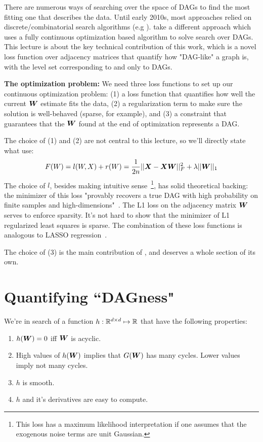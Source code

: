 \documentclass[11pt,a4paper]{article}
\begin{document}
There are numerous ways of searching over the space of DAGs to find the most fitting one that describes the data. Until early 2010s, most approaches relied on discrete/combinatorial search algorithms (e.g \citet{heckerman1994combination}). \citet{zheng2018dags} take a different approach which uses a fully continuous optimization based algorithm to solve search over DAGs. This lecture is about the key technical contribution of this work, which is a novel loss function over adjacency matrices that quantify how "DAG-like" a graph is, with the level set corresponding to and only to DAGs. 

\textbf{The optimization problem: } We need three loss functions to set up our continuous optimization problem: (1) a loss function that quantifies how well the current ${\bm{W}}$ estimate fits the data, (2) a regularization term to make sure the solution is well-behaved (sparse, for example), and (3) a constraint that guarantees that the ${\bm{W}}$ found at the end of optimization represents a DAG. 

The choice of (1) and (2) are not central to this lecture, so we'll directly state what \citet{zheng2018dags} use:
\begin{align}
    F(W) = l(W, X) + r(W) = \frac{1}{2n} ||{\bm{X}} - {\bm{X}} {\bm{W}}||_{F}^{2} + \lambda ||{\bm{W}}||_1
\end{align}
The choice of $l$, besides making intuitive sense~\footnote{This loss has a maximum likelihood interpretation if one assumes that the exogenous noise terms are unit Gaussian.}, has solid theoretical backing: the minimizer of this loss "provably recovers a true DAG with high probability on finite samples and high-dimensions"~\citep{zheng2018dags}. The L1 loss on the adjacency matrix ${\bm{W}}$ serves to enforce sparsity. It's not hard to show that the minimizer of L1 regularized least squares is sparse. The combination of these loss functions is analogous to LASSO regression~\citep{tibshirani1996regression}. 

The choice of (3) is the main contribution of \citep{zheng2018dags}, and deserves a whole section of its own. 

\section{Quantifying ``DAGness"}
We're in search of a function $h: \mathbb{R}^{d \times d} \mapsto \mathbb{R}$ that have the following properties:
\begin{enumerate}
    \item $h({\bm{W}}) = 0$ iff ${\bm{W}}$ is acyclic. 
    \item High values of $h({\bm{W}})$ implies that $G({\bm{W}})$ has many cycles. Lower values imply not many cycles. 
    \item $h$ is smooth.
    \item $h$ and it's derivatives are easy to compute. 
\end{enumerate}
\end{document}
